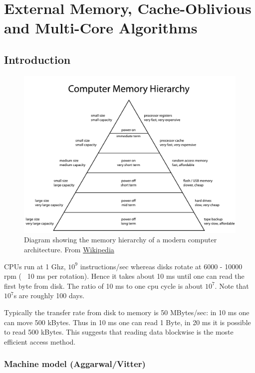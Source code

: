 \chapter{External Memory, Cache-Oblivious and Multi-Core Algorithms}

\section{Introduction}

\begin{figure}
\begin{center}
\includegraphics[width=0.8\linewidth]{./images/ComputerMemoryHierarchy}
\end{center}
\caption{Diagram showing the memory hierarchy of a modern computer architecture. From \href{http://en.wikipedia.org/wiki/File:ComputerMemoryHierarchy.svg}{Wikipedia}}
\end{figure}

CPUs run at 1 Ghz, $10^9$ instructions/sec whereas disks rotate at 6000 - 10000 rpm ( ~10 ms per rotation). Hence it takes about 10 ms until one can read the first byte from disk. The ratio of 10 ms to one cpu cycle is about $10^7$. Note that $10^7$s are roughly 100 days.

Typically the transfer rate from disk to memory is 50 MBytes/sec: in 10 ms one can move 500 kBytes. Thus in 10 ms one can read 1 Byte, in 20 ms it is possible to read 500 kBytes. This  suggests that reading data blockwise is the moste efficient access method.

\subsection{Machine model (Aggarwal/Vitter)}

